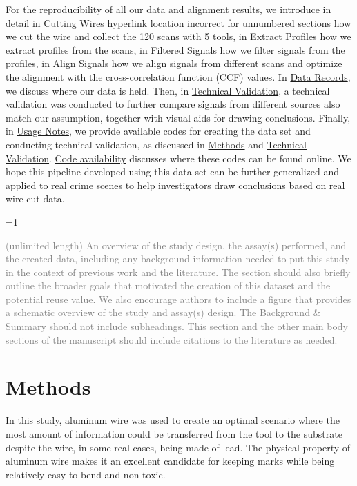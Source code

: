 \documentclass[fleqn,10pt]{wlscirep}
\newcommand{\tom}[1]{{\textcolor{RedOrange}{#1}}}
\newcommand{\ifinstruction}{0} %
\begin{document}
For the reproducibility of all our data and alignment results, we
introduce in detail in \hyperref[sec-cutting-wires]{Cutting Wires}
\tom{hyperlink location incorrect for unnumbered sections} how we cut
the wire and collect the 120 scans with 5 tools, in
\hyperref[sec-extract-profiles]{Extract Profiles} how we extract
profiles from the scans, in \hyperref[sec-filtered-signals]{Filtered
Signals} how we filter signals from the profiles, in
\hyperref[sec-align-signals]{Align Signals} how we align signals from
different scans and optimize the alignment with the cross-correlation
function (CCF) values. In \hyperref[sec-data-records]{Data Records}, we
discuss where our data is held. Then, in
\hyperref[sec-technical-validation]{Technical Validation}, a technical
validation was conducted to further compare signals from different
sources also match our assumption, together with visual aids for drawing
conclusions. Finally, in \hyperref[sec-usage-notes]{Usage Notes}, we
provide available codes for creating the data set and conducting
technical validation, as discussed in \hyperref[sec-methods]{Methods}
and \hyperref[sec-technical-validation]{Technical Validation}.
\hyperref[sec-code-availability]{Code availability} discusses where
these codes can be found online. We hope this pipeline developed using
this data set can be further generalized and applied to real crime
scenes to help investigators draw conclusions based on real wire cut
data.

\ifnum \ifinstruction=1

\textcolor{gray}{(unlimited length) An overview of the study design, the assay(s) performed, and the created data, including any background information needed to put this study in the context of previous work and the literature. The section should also briefly outline the broader goals that motivated the creation of this dataset and the potential reuse value. We also encourage authors to include a figure that provides a schematic overview of the study and assay(s) design. The Background \& Summary should not include subheadings. This section and the other main body sections of the manuscript should include citations to the literature as needed.}
\fi

\section*{Methods}\label{sec-methods}

In this study, aluminum wire was used to create an optimal scenario
where the most amount of information could be transferred from the tool
to the substrate despite the wire, in some real cases, being made of
lead. The physical property of aluminum wire makes it an excellent
candidate for keeping marks while being relatively easy to bend and
non-toxic.
\end{document}
